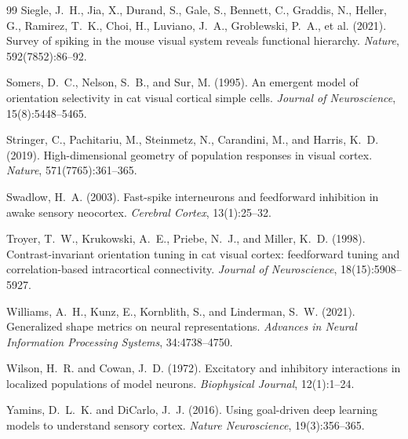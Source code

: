 \documentclass[11pt,onecolumn]{article}
\begin{document}
\begin{thebibliography}{99}
Siegle, J.~H., Jia, X., Durand, S., Gale, S., Bennett, C.,
Graddis, N., Heller, G., Ramirez, T.~K., Choi, H., Luviano, J.~A.,
Groblewski, P.~A., et al. (2021).
Survey of spiking in the mouse visual system reveals functional hierarchy.
\textit{Nature}, 592(7852):86--92.

Somers, D.~C., Nelson, S.~B., and Sur, M. (1995).
An emergent model of orientation selectivity in cat visual cortical simple
cells.
\textit{Journal of Neuroscience}, 15(8):5448--5465.

Stringer, C., Pachitariu, M., Steinmetz, N., Carandini, M., and
Harris, K.~D. (2019).
High-dimensional geometry of population responses in visual cortex.
\textit{Nature}, 571(7765):361--365.

Swadlow, H.~A. (2003).
Fast-spike interneurons and feedforward inhibition in awake sensory
neocortex.
\textit{Cerebral Cortex}, 13(1):25--32.

Troyer, T.~W., Krukowski, A.~E., Priebe, N.~J., and Miller, K.~D. (1998).
Contrast-invariant orientation tuning in cat visual cortex: feedforward
tuning and correlation-based intracortical connectivity.
\textit{Journal of Neuroscience}, 18(15):5908--5927.

Williams, A.~H., Kunz, E., Kornblith, S., and Linderman, S.~W. (2021).
Generalized shape metrics on neural representations.
\textit{Advances in Neural Information Processing Systems},
34:4738--4750.

Wilson, H.~R. and Cowan, J.~D. (1972).
Excitatory and inhibitory interactions in localized populations of model
neurons.
\textit{Biophysical Journal}, 12(1):1--24.

Yamins, D.~L.~K. and DiCarlo, J.~J. (2016).
Using goal-driven deep learning models to understand sensory cortex.
\textit{Nature Neuroscience}, 19(3):356--365.

\end{thebibliography}
\end{document}
